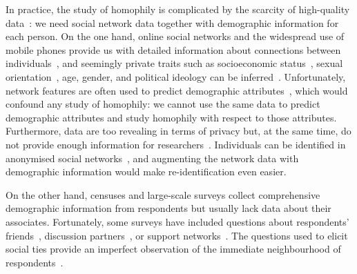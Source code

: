 \documentclass{scrartcl}
\begin{document}
In practice, the study of homophily is complicated by the scarcity of high-quality data~\cite{Butts2012, Blumenstock2013}: we need social network data together with demographic information for each person. On the one hand, online social networks and the widespread use of mobile phones provide us with detailed information about connections between individuals~\cite{Golder2014}, and seemingly private traits such as socioeconomic status~\cite{Blumenstock2015, Luo2017}, sexual orientation~\cite{Wang2017}, age, gender, and political ideology can be inferred~\cite{Kosinski2013}. Unfortunately, network features are often used to predict demographic attributes~\cite{Wang2013,Blumenstock2015,Luo2017,Kosinski2013}, which would confound any study of homophily: we cannot use the same data to predict demographic attributes and study homophily with respect to those attributes. Furthermore, data are too revealing in terms of privacy but, at the same time, do not provide enough information for researchers~\cite{Golder2014}. Individuals can be identified in anonymised social networks~\cite{Backstrom2011, Narayanan2008}, and augmenting the network data with demographic information would make re-identification even easier.

On the other hand, censuses and large-scale surveys collect comprehensive demographic information from respondents but usually lack data about their associates. Fortunately, some surveys have included questions about respondents' friends~\cite{Huckfeldt1983, Johnson1989}, discussion partners~\cite{Marsden1987, McPherson2006}, or support networks~\cite{Kalmijn2007, Banerjee2013}. The questions used to elicit social ties provide an imperfect observation of the immediate neighbourhood of respondents~\cite{Marin2004,Eagle2015,Eveland-Jr.2017}.


\end{document}

